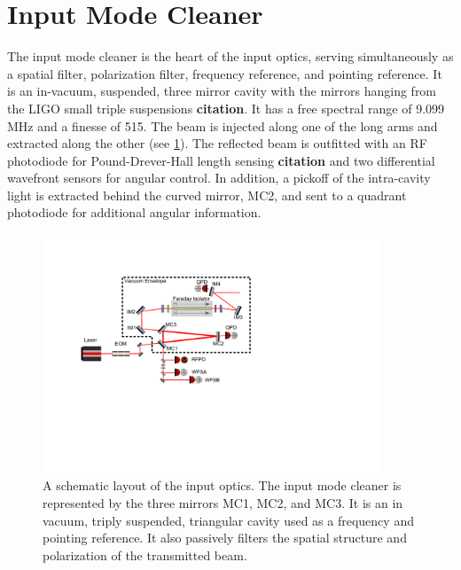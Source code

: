 
\section{Input Mode Cleaner}

The input mode cleaner is the heart of the input optics, serving simultaneously as a spatial filter, 
polarization filter, frequency reference, and pointing reference.  
It is an in-vacuum, suspended, three mirror cavity with the mirrors hanging from the LIGO small triple 
suspensions \textbf{citation}.  
It has a free spectral range of 9.099 MHz and a finesse of 515.  
The beam is injected along one of the long arms and extracted along the other (see \ref{fig:ioAll}).  
The reflected beam is outfitted with an RF photodiode for Pound-Drever-Hall length sensing \textbf{citation} 
and two differential wavefront sensors for angular control.  
In addition, a pickoff of the intra-cavity light is extracted behind the curved mirror, MC2, and sent to a 
quadrant photodiode for additional angular information.  

\begin{figure}
	\centering
	\includegraphics[width=0.9\textwidth, trim=3.5cm 7.5cm 11cm 3.5cm]{IO_Drawing.pdf}
	\caption{A schematic layout of the input optics\cite{franzen_optics_drawings}.  
		The input mode cleaner is represented by the three mirrors MC1, MC2, and MC3.  
		It is an in vacuum, triply suspended, triangular cavity used as a frequency 
		and pointing reference.  It also passively filters the spatial structure 
		and polarization of the transmitted beam.}
	\label{fig:ioAll}
\end{figure}		

